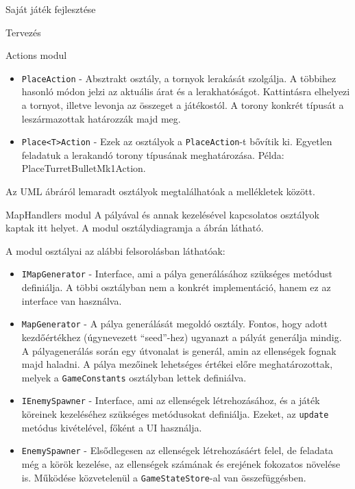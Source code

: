 \begin{MyChapter}{Saját játék fejlesztése}
\begin{MySection}{Tervezés}
\begin{MySubSection}{Actions modul}
\begin{itemize}
				\item \texttt{PlaceAction} - Absztrakt osztály, a tornyok lerakását szolgálja. A többihez hasonló módon jelzi az aktuális árat és a lerakhatóságot. Kattintásra elhelyezi a tornyot, illetve levonja az összeget a játékostól. A torony konkrét típusát a leszármazottak határozzák majd meg.
				
				\item \texttt{Place<T>Action} - Ezek az osztályok a \texttt{PlaceAction}-t bővítik ki. Egyetlen feladatuk a lerakandó torony típusának meghatározása. Példa: PlaceTurretBulletMk1Action.
			\end{itemize}
			
			Az UML ábráról lemaradt osztályok megtalálhatóak a mellékletek között.
		\end{MySubSection}
	
		\begin{MySubSection}{MapHandlers modul}
			A pályával és annak kezelésével kapcsolatos osztályok kaptak itt helyet.
			A modul osztálydiagramja a  ábrán látható.
			
			A modul osztályai az alábbi felsorolásban láthatóak:
			\begin{itemize}
				\item \texttt{IMapGenerator} - Interface, ami a pálya generálásához szükséges metódust definiálja. A többi osztályban nem a konkrét implementáció, hanem ez az interface van használva.
				
				\item \texttt{MapGenerator} - A pálya generálását megoldó osztály. Fontos, hogy adott kezdőértékhez (úgynevezett ``seed''-hez) ugyanazt a pályát generálja mindig. A pályagenerálás során egy útvonalat is generál, amin az ellenségek fognak majd haladni. A pálya mezőinek lehetséges értékei előre meghatározottak, melyek a \texttt{GameConstants} osztályban lettek definiálva.
				
				\item \texttt{IEnemySpawner} - Interface, ami az ellenségek létrehozásához, és a játék köreinek kezeléséhez szükséges metódusokat definiálja. Ezeket, az \texttt{update} metódus kivételével, főként a UI használja.
				
				\item \texttt{EnemySpawner} - Elsődlegesen az ellenségek létrehozásáért felel, de feladata még a körök kezelése, az ellenségek számának és erejének fokozatos növelése is. Működése közvetelenül a \texttt{GameStateStore}-al van összefüggésben.
				

\end{itemize}
\end{MySubSection}
\end{MySection}
\end{MyChapter}
